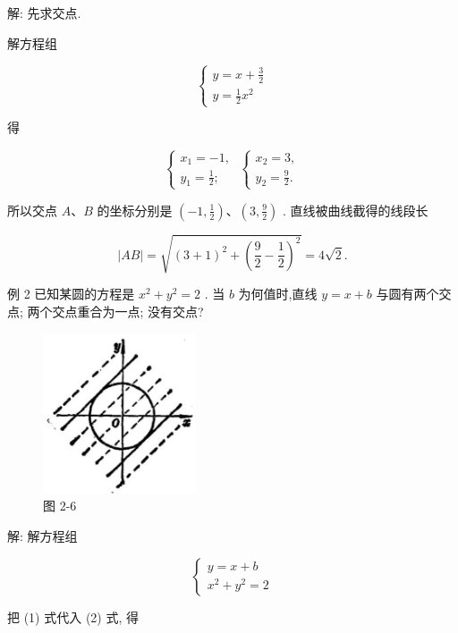 \documentclass[lang=cn,newtx,10pt,scheme=chinese]{elegantbook}
\begin{document}
解: 先求交点.

解方程组

\[
  \left\{ \begin{array}{l} y = x + \frac{3}{2} \\ y = \frac{1}{2}{x}^{2} \end{array}\right.
\]

得

\[
  \left\{ {\begin{array}{l} {x}_{1} = - 1, \\ {y}_{1} = \frac{1}{2}; \end{array}\;\left\{ \begin{array}{l} {x}_{2} = 3, \\ {y}_{2} = \frac{9}{2}. \end{array}\right. }\right.
\]

所以交点 \(A\text{、}B\) 的坐标分别是 \(\left( {-1,\frac{1}{2}}\right) \text{、}\left( {3,\frac{9}{2}}\right)\) . 直线被曲线截得的线段长

\[
  \left| {AB}\right| = \sqrt{{\left( 3 + 1\right) }^{2} + {\left( \frac{9}{2} - \frac{1}{2}\right) }^{2}} = 4\sqrt{2}.
\]

例 2 已知某圆的方程是 \({x}^{2} + {y}^{2} = 2\) . 当 \(b\) 为何值时,直线 \(y = x + b\) 与圆有两个交点; 两个交点重合为一点; 没有交点?

\begin{figure}[h]
  \centering
  \includegraphics[max width=0.4\textwidth]{images/01912cc2-ffb6-728e-9ae7-b113ff05c64b_75_443692.jpg}
  \caption{图 2-6}
\end{figure}



解: 解方程组

\[
  \left\{ \begin{array}{l} y = x + b \\ {x}^{2} + {y}^{2} = 2 \end{array}\right. \tag{1 2}
\]

把 (1) 式代入 (2) 式, 得
\end{document}
